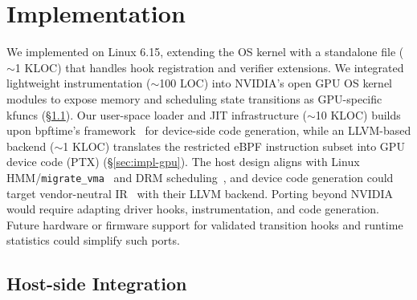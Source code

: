 
\section{Implementation}
\label{sec:implementation}

We implemented \sys on Linux 6.15, extending the OS kernel with a standalone file ($\sim$1 KLOC) that handles hook registration and verifier extensions.
We integrated lightweight instrumentation ($\sim$100 LOC) into NVIDIA's open GPU OS kernel modules to expose memory and scheduling state transitions as GPU-specific kfuncs (\S\ref{sec:impl-host}).
Our user-space loader and JIT infrastructure ($\sim$10 KLOC) builds upon bpftime's framework~\cite{bpftime} for device-side code generation, while an LLVM-based backend ($\sim$1 KLOC) translates the restricted \sys eBPF instruction subset into GPU device code (PTX) (\S\ref{sec:impl-gpu}).
The host design aligns with Linux HMM/\texttt{migrate\_vma}~\cite{linux-gpusvm-doc} and DRM scheduling~\cite{drm-gpu-sched}, and device code generation could target vendor-neutral IR~\cite{spirv-ir-rfc} with their LLVM backend.
Porting beyond NVIDIA would require adapting driver hooks, instrumentation, and code generation.
Future hardware or firmware support for validated transition hooks and runtime statistics could simplify such ports.

\subsection{Host-side Integration}
\label{sec:impl-host}
